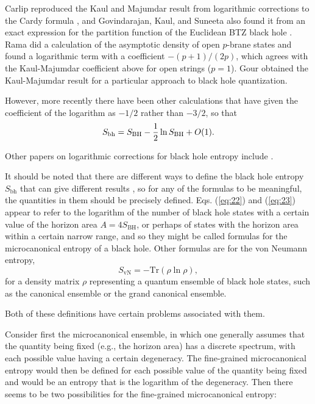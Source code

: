 \documentclass[12pt]{article} \usepackage{latexsym}
\begin{document}
Carlip \cite{Carlip} reproduced the Kaul and Majumdar result from
logarithmic corrections to the Cardy formula \cite{Cardy,BCN}, and
Govindarajan, Kaul, and Suneeta \cite{GKS2} also found it from an exact
expression for the partition function of the Euclidean BTZ black hole
\cite{BTZ,BHTZ}.  Rama \cite{Rama} did a calculation of the asymptotic
density of open $p$-brane states and found a logarithmic term with a
coefficient $-(p+1)/(2p)$, which agrees with the Kaul-Majumdar
coefficient above for open strings ($p=1$).  Gour \cite{Gour} obtained
the Kaul-Majumdar result for a particular approach to black hole
quantization.

However, more recently there have been other calculations
\cite{DL,Meiss,GM1,GM2} that have given the coefficient of the
logarithm as $-1/2$ rather than $-3/2$, so that
 \begin{equation}
 S_{\mathrm{bh}} = S_{\mathrm{BH}} - {1\over 2} \ln{S_{\mathrm{BH}}} +
 O(1).
 \label{eq:23}
 \end{equation}
 
Other papers on logarithmic corrections for black hole entropy include
\cite{GM94,DKM,DMB,MP,NOO,CG,CM2,Set1,Set2,
ACAP,Hod,Myung,Park2,AL,Med1,CM3,More,Med2,Khrip}.

It should be noted that there are different ways to define the black
hole entropy $S_{\mathrm{bh}}$ that can give different results
\cite{DMB,CM2}, so for any of the formulas to be meaningful, the
quantities in them should be precisely defined.  Eqs. (\ref{eq:22}) and
(\ref{eq:23}) appear to refer to the logarithm of the number of black
hole states with a certain value of the horizon area $A =
4S_{\mathrm{BH}}$, or perhaps of states with the horizon area within a
certain narrow range, and so they might be called formulas for the
microcanonical entropy of a black hole.  Other formulas are for the von
Neumann entropy,
 \begin{equation}
 S_{\mathrm{vN}} = - \mathrm{Tr}(\rho \ln{\rho}),
 \label{eq:24}
 \end{equation}
for a density matrix $\rho$ representing a quantum ensemble of black
hole states, such as the canonical ensemble or the grand canonical
ensemble.

Both of these definitions have certain problems associated with them. 

Consider first the microcanonical ensemble, in which one generally
assumes that the quantity being fixed (e.g., the horizon area) has a
discrete spectrum, with each possible value having a certain
degeneracy.  The fine-grained microcanonical entropy would then be
defined for each possible value of the quantity being fixed and would
be an entropy that is the logarithm of the degeneracy.  Then there
seems to be two possibilities for the fine-grained microcanonical
entropy:
\end{document}
